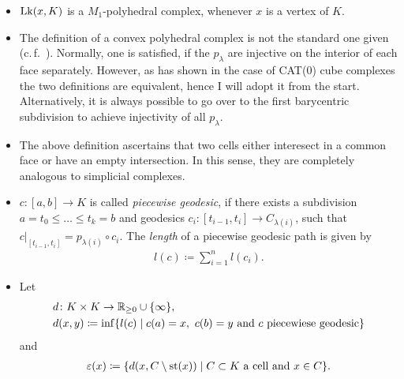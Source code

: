 \begin{rem}
  \begin{itemize}
  \item \(\operatorname{Lk}(x, K)\) is a \(M_1\)-polyhedral complex, whenever \(x\) is a vertex of \(K\).
  \item The definition of a convex polyhedral complex is not the standard one given (c.\,f.~\cite[Def.~I.7.37]{MR1744486}). Normally, one is satisfied, if the \(p_\lambda\) are injective on the interior of each face separately. However, as \textcite[Thm.~C.4]{MR3029427} has shown in the case of CAT(0) cube complexes the two definitions are equivalent, hence I will adopt it from the start. Alternatively, it is always possible to go over to the first barycentric subdivision to achieve injectivity of all \(p_\lambda\).
  \item The above definition ascertains that two cells either interesect in a common face or have an empty intersection. In this sense, they are completely analogous to simplicial complexes. 
  \end{itemize}
\end{rem}

\begin{bsp}
\end{bsp}

\begin{defin}
  \begin{itemize}
  \item \(c\colon [a, b] \to K\) is called \emph{piecewise geodesic}, if there exists a subdivision \(a = t_0 \leq \dots \leq t_k = b\) and geodesics \(c_i\colon [t_{i-1}, t_i] \to C_{\lambda(i)}\), such that \(c|_{[t_{i-1}, t_i]} = p_{\lambda(i)} \circ c_i\). The \emph{length} of a piecewise geodesic path is given by
    \begin{align*}
      l(c) \coloneqq \sum_{i=1}^n l(c_i).
    \end{align*}
  \item Let
    \begin{align*}
      &d\colon K \times K \to \mathbb{R}_{\geq 0} \cup \{\infty\},\\
      &d(x,y) \coloneqq \inf\{l(c) \mid c(a) = x,\ c(b) = y \text{ and } c \text{ piecewiese geodesic}\}
    \end{align*}
    and
    \begin{align}
      \varepsilon(x) \coloneqq \{d(x, C \setminus \operatorname{st}(x)) \mid C \subset K \text{ a cell and } x \in C\}. \label{eq:epsilon}
    \end{align}

  \end{itemize}
\end{defin}


